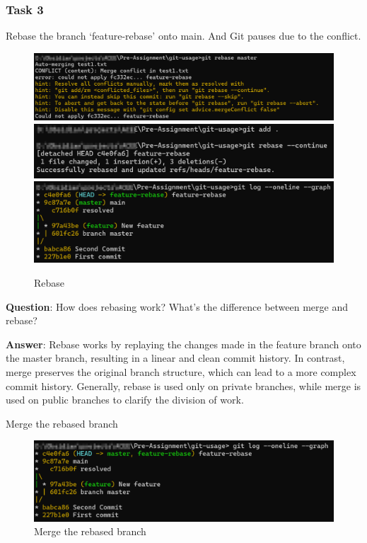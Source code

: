 \subsubsection{Task 3}
Rebase the branch `feature-rebase' onto main. And Git pauses due to the conflict.
\begin{figure}[H]
    \centering
    \includegraphics[width = \textwidth]{./figures/rebase-abort.png}
    \includegraphics[width = \textwidth]{./figures/rebase-continue.png}
    \includegraphics[width = \textwidth]{./figures/rebase-history.png}
    \caption{Rebase}
\end{figure}

\textbf{Question}: How does rebasing work? What’s the difference between merge and rebase?

\textbf{Answer}: Rebase works by replaying the changes made in the feature branch onto the master branch, resulting in a linear and clean commit history. In contrast, merge preserves the original branch structure, which can lead to a more complex commit history. Generally, rebase is used only on private branches,
while merge is used on public branches to clarify the division of work.

Merge the rebased branch
\begin{figure}[H]
    \centering
    \includegraphics[width = \textwidth]{./figures/fast-forward-merge.png}
    \caption{Merge the rebased branch}
\end{figure}

